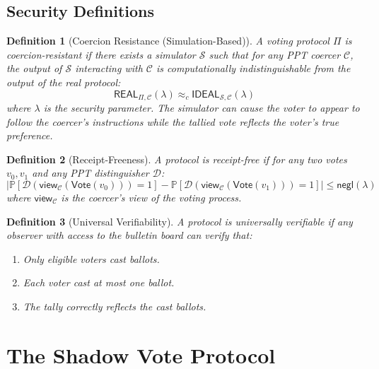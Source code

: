 \documentclass[11pt,a4paper]{article}
\newcommand{\PP}{\mathbb{P}}
\newcommand{\CC}{\mathcal{C}}
\newcommand{\secparam}{\lambda}
\newtheorem{definition}{Definition}
\begin{document}
\subsection{Security Definitions}

\begin{definition}[Coercion Resistance (Simulation-Based)]
A voting protocol $\Pi$ is coercion-resistant if there exists a simulator $\mathcal{S}$ such that for any PPT coercer $\CC$, the output of $\mathcal{S}$ interacting with $\CC$ is computationally indistinguishable from the output of the real protocol:
\begin{equation}
    \mathsf{REAL}_{\Pi, \CC}(\secparam) \approx_c \mathsf{IDEAL}_{\mathcal{S}, \CC}(\secparam)
\end{equation}
where $\secparam$ is the security parameter. The simulator can cause the voter to appear to follow the coercer's instructions while the tallied vote reflects the voter's true preference.
\end{definition}

\begin{definition}[Receipt-Freeness]
A protocol is receipt-free if for any two votes $v_0, v_1$ and any PPT distinguisher $\mathcal{D}$:
\begin{equation}
    |\PP[\mathcal{D}(\mathsf{view}_{\CC}(\mathsf{Vote}(v_0))) = 1] - \PP[\mathcal{D}(\mathsf{view}_{\CC}(\mathsf{Vote}(v_1))) = 1]| \leq \mathsf{negl}(\secparam)
\end{equation}
where $\mathsf{view}_{\CC}$ is the coercer's view of the voting process.
\end{definition}

\begin{definition}[Universal Verifiability]
A protocol is universally verifiable if any observer with access to the bulletin board can verify that:
\begin{enumerate}[label=(\roman*)]
    \item Only eligible voters cast ballots.
    \item Each voter cast at most one ballot.
    \item The tally correctly reflects the cast ballots.
\end{enumerate}
\end{definition}

\section{The Shadow Vote Protocol}
\end{document}
